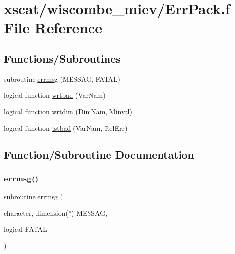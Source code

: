 \hypertarget{wiscombe__miev_2_err_pack_8f}{}\section{xscat/wiscombe\+\_\+miev/\+Err\+Pack.f File Reference}
\label{wiscombe__miev_2_err_pack_8f}
\subsection*{Functions/\+Subroutines}
\begin{DoxyCompactItemize}
\item 
subroutine \hyperlink{wiscombe__miev_2_err_pack_8f_a5b228fa8b6f6dd90e6de7beb661002ff}{errmsg} (M\+E\+S\+S\+AG, F\+A\+T\+AL)
\item 
logical function \hyperlink{wiscombe__miev_2_err_pack_8f_a39b9b11ebe066217c5eb36dda9009bab}{wrtbad} (Var\+Nam)
\item 
logical function \hyperlink{wiscombe__miev_2_err_pack_8f_ac00ea4bd5d2336abbbfaa44c3822eaad}{wrtdim} (Dim\+Nam, Minval)
\item 
logical function \hyperlink{wiscombe__miev_2_err_pack_8f_a17579d06a5cb7a305570f7082e20d81c}{tstbad} (Var\+Nam, Rel\+Err)
\end{DoxyCompactItemize}


\subsection{Function/\+Subroutine Documentation}
\mbox{\label{wiscombe__miev_2_err_pack_8f_a5b228fa8b6f6dd90e6de7beb661002ff}} 
\subsubsection{\texorpdfstring{errmsg()}{errmsg()}}
{\footnotesize\ttfamily subroutine errmsg (\begin{DoxyParamCaption}\item[{character, dimension($\ast$)}]{M\+E\+S\+S\+AG,  }\item[{logical}]{F\+A\+T\+AL }\end{DoxyParamCaption})}

\mbox{\label{wiscombe__miev_2_err_pack_8f_a17579d06a5cb7a305570f7082e20d81c}} 
